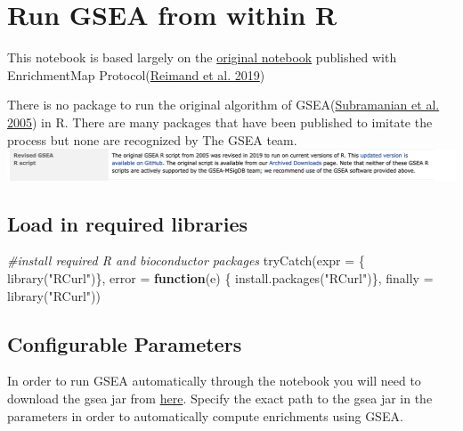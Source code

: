 \documentclass[
]{book}
\newenvironment{Shaded}{\begin{snugshade}}{\end{snugshade}}
\newcommand{\AttributeTok}[1]{\textcolor[rgb]{0.77,0.63,0.00}{#1}}
\newcommand{\CommentTok}[1]{\textcolor[rgb]{0.56,0.35,0.01}{\textit{#1}}}
\newcommand{\ControlFlowTok}[1]{\textcolor[rgb]{0.13,0.29,0.53}{\textbf{#1}}}
\newcommand{\FunctionTok}[1]{\textcolor[rgb]{0.00,0.00,0.00}{#1}}
\newcommand{\NormalTok}[1]{#1}
\newcommand{\StringTok}[1]{\textcolor[rgb]{0.31,0.60,0.02}{#1}}
\begin{document}
\hypertarget{run-gsea-from-within-r}{%
\chapter{Run GSEA from within R}\label{run-gsea-from-within-r}}

This notebook is based largely on the \href{https://baderlab.github.io/Cytoscape_workflows/EnrichmentMapPipeline/Protocol2_createEM.html}{original notebook} published with EnrichmentMap Protocol(\protect\hyperlink{ref-em2019}{Reimand et al. 2019})

There is no package to run the original algorithm of GSEA(\protect\hyperlink{ref-gsea2005}{Subramanian et al. 2005}) in R. There are many packages that have been published to imitate the process but none are recognized by The GSEA team.\\
\includegraphics{./images/gsea_r_package_message.png}

\hypertarget{load-in-required-libraries}{%
\section{Load in required libraries}\label{load-in-required-libraries}}

\begin{Shaded}
\begin{Highlighting}[]
\CommentTok{\#install required R and bioconductor packages}
\FunctionTok{tryCatch}\NormalTok{(}\AttributeTok{expr =}\NormalTok{ \{ }\FunctionTok{library}\NormalTok{(}\StringTok{"RCurl"}\NormalTok{)\}, }
         \AttributeTok{error =} \ControlFlowTok{function}\NormalTok{(e) \{  }\FunctionTok{install.packages}\NormalTok{(}\StringTok{"RCurl"}\NormalTok{)\}, }
         \AttributeTok{finally =} \FunctionTok{library}\NormalTok{(}\StringTok{"RCurl"}\NormalTok{))}
\end{Highlighting}
\end{Shaded}

\hypertarget{configurable-parameters}{%
\section{Configurable Parameters}\label{configurable-parameters}}

In order to run GSEA automatically through the notebook you will need to download the gsea jar from \href{http://software.broadinstitute.org/gsea/downloads.jsp}{here}. Specify the exact path to the gsea jar in the parameters in order to automatically compute enrichments using GSEA.
\end{document}
